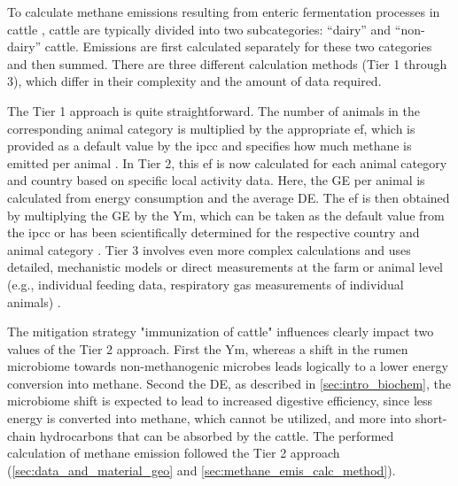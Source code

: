 To calculate methane emissions resulting from enteric fermentation processes in cattle \parencite{ipccChapter10Emission2006, IPCC_2019_Chapter_EnterFE}, cattle are typically divided into two subcategories: “dairy” and “non-dairy” cattle. Emissions are first calculated separately for these two categories and then summed. There are three different calculation methods (Tier 1 through 3), which differ in their complexity and the amount of data required.

The Tier 1 approach is quite straightforward. The number of animals in the corresponding animal category is multiplied by the appropriate \acrfull{ef}, which is provided as a default value by the \acrshort{ipcc} and specifies how much methane is emitted per animal \parencite[Eq.\,10.19]{ipccChapter10Emission2006}.
In Tier 2, this \acrshort{ef} is now calculated for each animal category and country based on specific local activity data. Here, the \acrfull{GE} per animal is calculated from energy consumption and the average \acrfull{DE}. The \acrshort{ef} is then obtained by multiplying the \acrshort{GE} by the \acrfull{Ym}, which can be taken as the default value from the \acrshort{ipcc} or has been scientifically determined for the respective country and animal category \parencite[Eq.\,10.21]{ipccChapter10Emission2006}.
Tier 3 involves even more complex calculations and uses detailed, mechanistic models or direct measurements at the farm or animal level (e.g., individual feeding data, respiratory gas measurements of individual animals) \parencite{IPCC_2006_complete_Guidline}.

The mitigation strategy "immunization of cattle" influences clearly impact two values of the Tier 2 approach. First the \acrshort{Ym}, whereas a shift in the rumen microbiome towards non-methanogenic microbes leads logically to a lower energy conversion into methane. Second the \acrshort{DE}, as described in \cref{sec:intro_biochem}, the microbiome shift is expected to lead to increased digestive efficiency, since less energy is converted into methane, which cannot be utilized, and more into short-chain hydrocarbons that can be absorbed by the cattle.
The performed calculation of methane emission followed the Tier 2 approach (\cref{sec:data_and_material_geo} and \cref{sec:methane_emis_calc_method}).


